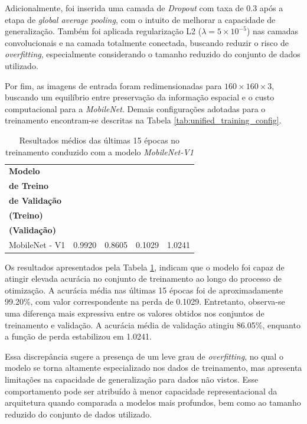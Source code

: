 Adicionalmente, foi inserida uma camada de \textit{Dropout} com taxa de $0.3$ após a etapa de \textit{global average pooling}, com o intuito de melhorar a capacidade de generalização. Também foi aplicada regularização L2 ($\lambda = 5 \times 10^{-5}$) nas camadas convolucionais e na camada totalmente conectada, buscando reduzir o risco de \textit{overfitting}, especialmente considerando o tamanho reduzido do conjunto de dados utilizado.

Por fim, as imagens de entrada foram redimensionadas para $160 \times 160 \times 3$, buscando um equilíbrio entre preservação da informação espacial e o custo computacional para a \textit{MobileNet}. Demais configurações adotadas para o treinamento encontram-se descritas na Tabela \ref{tab:unified_training_config}. 

\begin{table}[h]
	\centering
	\caption{Resultados médios das últimas 15 épocas no treinamento conduzido com a modelo \textit{MobileNet-V1}}
	\label{tab:results_mobilenet}
	\setlength{\tabcolsep}{3pt}
	
	\begin{tabular}{l|c|c|c|c}
		\toprule
		\textbf{Modelo} &
		\makecell{\textbf{Acurácia}\\ \textbf{de Treino}} &
		\makecell{\textbf{Acurácia}\\ \textbf{de Validação}} &
		\makecell{\textbf{Perda}\\ \textbf{(Treino)}} &
		\makecell{\textbf{Perda}\\ \textbf{(Validação)}} \\
		\midrule
		
		MobileNet - V1 & 0.9920 & 0.8605 & 0.1029 & 1.0241 \\

		\bottomrule
	\end{tabular}
\end{table}

Os resultados apresentados pela Tabela \ref{tab:results_mobilenet}, indicam que o modelo foi capaz de atingir elevada acurácia no conjunto de treinamento ao longo do processo de otimização. A acurácia média nas últimas 15 épocas foi de aproximadamente 99.20\%, com valor correspondente na perda de 0.1029. Entretanto, observa-se uma diferença mais expressiva entre os valores obtidos nos conjuntos de treinamento e validação. A acurácia média de validação atingiu 86.05\%, enquanto a função de perda estabilizou em 1.0241.

Essa discrepância sugere a presença de um leve grau de \textit{overfitting}, no qual o modelo se torna altamente especializado nos dados de treinamento, mas apresenta limitações na capacidade de generalização para dados não vistos. Esse comportamento pode ser atribuído à menor capacidade representacional da arquitetura quando comparada a modelos mais profundos, bem como ao tamanho reduzido do conjunto de dados utilizado.

